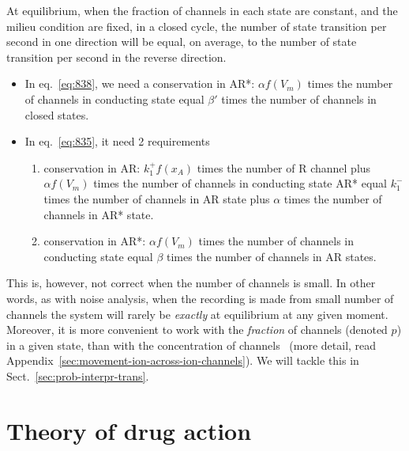 At equilibrium, when the fraction of channels in each state are
constant, and the milieu condition are fixed, in a closed cycle, the
number of state transition per second in one direction will be equal,
on average, to the number of state transition per second in the
reverse direction.
\begin{itemize}
\item In eq.~\eqref{eq:838}, we need a conservation in AR*: $\alpha
  f(V_m)$ times the number of channels in conducting state equal
  $\beta'$ times the number of channels in closed states.
\item In eq.~\eqref{eq:835}, it need 2 requirements
  \begin{enumerate}
  \item conservation in AR: $k^+_1f(x_A)$ times the number of R
    channel plus $\alpha f(V_m)$ times the number of channels in
    conducting state AR* equal $k_1^-$ times the number of channels in
    AR state plus $\alpha$ times the number of channels in AR* state.
  \item conservation in AR*: $\alpha f(V_m)$ times the number of
    channels in conducting state equal $\beta$ times the number of
    channels in AR states.
  \end{enumerate}
\end{itemize}


This is, however, not correct when the number of channels is small. In
other words, as with noise analysis, when the recording is made from
small number of channels the system will rarely be {\it exactly} at
equilibrium at any given moment. Moreover, it is more convenient to
work with the {\it fraction} of channels (denoted $p$) in a given
state, than with the concentration of
channels~\citep{colquhoun1994isc} (more detail, read
Appendix~\ref{sec:movement-ion-across-ion-channels}). We will tackle this in
Sect.~\ref{sec:prob-interpr-trans}.





\section{Theory of drug action}
\label{sec:drug_action}

